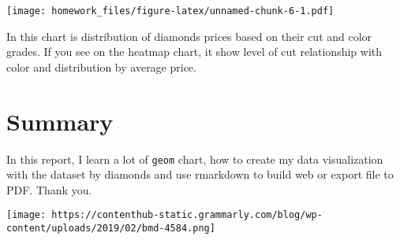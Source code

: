 \documentclass[
]{article}
\begin{document}
\texttt{[image: homework\_files/figure-latex/unnamed-chunk-6-1.pdf]}

In this chart is distribution of diamonds prices based on their cut and
color grades. If you see on the heatmap chart, it show level of cut
relationship with color and distribution by average price.

\hypertarget{summary}{%
\section{Summary}\label{summary}}

In this report, I learn a lot of \texttt{geom} chart, how to create my
data visualization with the dataset by diamonds and use rmarkdown to
build web or export file to PDF. Thank you.

\texttt{[image: https://contenthub-static.grammarly.com/blog/wp-content/uploads/2019/02/bmd-4584.png]}
\end{document}
